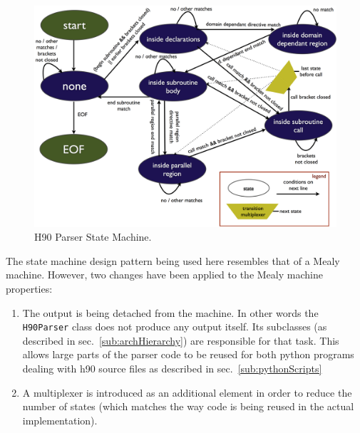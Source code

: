 \begin{figure}[htpb]
	\centering
	\includegraphics[width=14cm]{figures/parserStateMachine}
	\caption[Parser State Machine]{H90 Parser State Machine.}
	\label{figure:parserStateMachine}
\end{figure}

The state machine design pattern being used here resembles that of a Mealy machine. However, two changes have been applied to the Mealy machine properties:
\begin{enumerate}
  \item The output is being detached from the machine. In other words the \verb|H90Parser| class does not produce any output itself. Its subclasses (as described in sec.~\ref{sub:archHierarchy}) are responsible for that task. This allows large parts of the parser code to be reused for both python programs dealing with h90 source files as described in sec.~\ref{sub:pythonScripts}
  \item A multiplexer is introduced as an additional element in order to reduce the number of states (which matches the way code is being reused in the actual implementation).
\end{enumerate}
 
